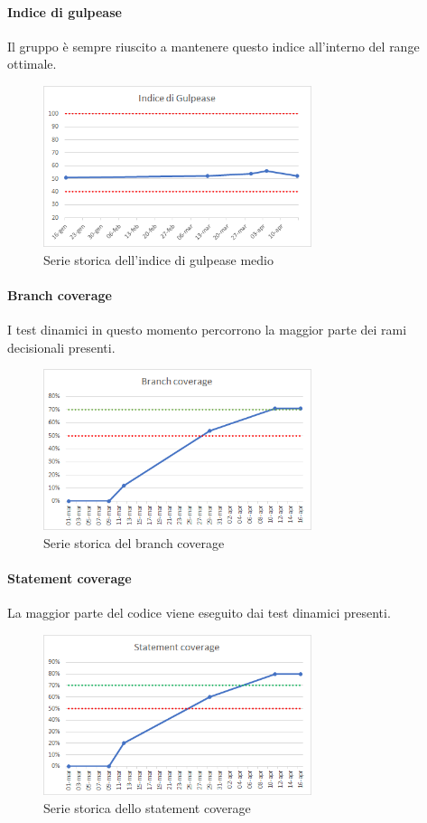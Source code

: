     \paragraph{Indice di gulpease} \Spazio
    Il gruppo è sempre riuscito a mantenere questo indice all'interno del range ottimale.
    \begin{figure}[H]
    	\centering 
    	\includegraphics[width=0.7\textwidth]{Images/Gulpease.png}
    	\caption{Serie storica dell'indice di gulpease medio}
    	\label{gul} 
    \end{figure}
    \paragraph{Branch coverage} \Spazio
    I test dinamici in questo momento percorrono la maggior parte dei rami decisionali presenti. 
    \begin{figure}[H]
    	\centering 
    	\includegraphics[width=0.7\textwidth]{Images/branch.png}
    	\caption{Serie storica del branch coverage}
    	\label{branch} 
    \end{figure}
    \paragraph{Statement coverage} \Spazio
    La maggior parte del codice viene eseguito dai test dinamici presenti.
    \begin{figure}[H]
    	\centering 
    	\includegraphics[width=0.7\textwidth]{Images/statement.png}
    	\caption{Serie storica dello statement coverage}
    	\label{statement} 
    \end{figure}
